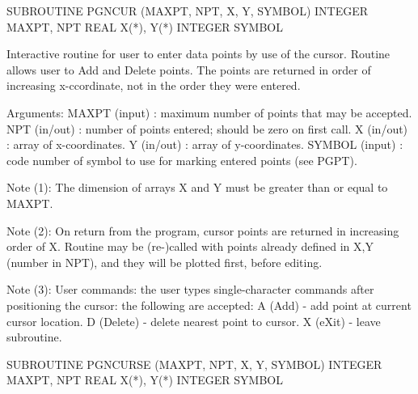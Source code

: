 {\eightpoint\begintt
      SUBROUTINE PGNCUR (MAXPT, NPT, X, Y, SYMBOL)
      INTEGER MAXPT, NPT
      REAL    X(*), Y(*)
      INTEGER SYMBOL
 
Interactive routine for user to enter data points by use of
the cursor.  Routine allows user to Add and Delete points.  The
points are returned in order of increasing x-ccordinate, not in the
order they were entered.
 
Arguments:
 MAXPT  (input)  : maximum number of points that may be accepted.
 NPT    (in/out) : number of points entered; should be zero on
                   first call.
 X      (in/out) : array of x-coordinates.
 Y      (in/out) : array of y-coordinates.
 SYMBOL (input)  : code number of symbol to use for marking
                   entered points (see PGPT).
 
Note (1): The dimension of arrays X and Y must be greater than or
equal to MAXPT.
 
Note (2): On return from the program, cursor points are returned in
increasing order of X. Routine may be (re-)called with points
already defined in X,Y (number in NPT), and they will be plotted
first, before editing.
 
Note (3): User commands: the user types single-character commands
after positioning the cursor: the following are accepted:
A (Add)    - add point at current cursor location.
D (Delete) - delete nearest point to cursor.
X (eXit)   - leave subroutine.
\endtt}

{\eightpoint\begintt
      SUBROUTINE PGNCURSE (MAXPT, NPT, X, Y, SYMBOL)
      INTEGER MAXPT, NPT
      REAL    X(*), Y(*)
      INTEGER SYMBOL
\endtt}

